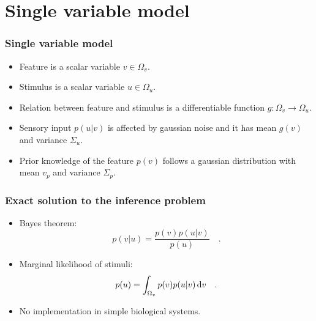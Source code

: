 \documentclass[aspectratio=169]{beamer}
\begin{document}
\section{Single variable model}
\begin{frame}
  \frametitle{Single variable model}
  \begin{itemize}
    \item<1-> Feature is a scalar variable $v \in \Omega_v$.
    \item<1-> Stimulus is a scalar variable $u \in \Omega_u$.
    \item<2-> Relation between feature and stimulus is a differentiable function $g : \Omega_v \to \Omega_u$.
    \item<3-> Sensory input $p(u | v)$ is affected by gaussian noise and it has mean $g(v)$ and variance $\Sigma_u$.
    \item<4-> Prior knowledge of the feature $p(v)$ follows a gaussian distribution with mean $v_p$ and variance $\Sigma_p$.
  \end{itemize}
\end{frame}

\begin{frame}
  \frametitle{Exact solution to the inference problem}
  \begin{itemize}
    \item<1-> Bayes theorem:
      \begin{equation}
        \label{eq:bayes}
        p(v | u) = \frac{p(v) p(u | v)}{p(u)}
        \quad .
      \end{equation}
    \item<2-> Marginal likelihood of stimuli:
      \begin{equation}
        \label{eq:marginal}
        p(u) = \int_{\Omega_v} p(v) p(u | v) \odif{v}
        \quad .
      \end{equation}
    \item<3-> No implementation in simple biological systems.
  \end{itemize}
\end{frame}
\end{document}
